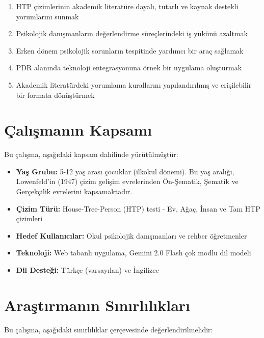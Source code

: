 \begin{enumerate}
  \item HTP çizimlerinin akademik literatüre dayalı, tutarlı ve kaynak destekli yorumlarını sunmak
  \item Psikolojik danışmanların değerlendirme süreçlerindeki iş yükünü azaltmak
  \item Erken dönem psikolojik sorunların tespitinde yardımcı bir araç sağlamak
  \item PDR alanında teknoloji entegrasyonuna örnek bir uygulama oluşturmak
  \item Akademik literatürdeki yorumlama kurallarını yapılandırılmış ve erişilebilir bir formata dönüştürmek
\end{enumerate}

\section{Çalışmanın Kapsamı}

Bu çalışma, aşağıdaki kapsam dahilinde yürütülmüştür:

\begin{itemize}
  \item \textbf{Yaş Grubu:} 5-12 yaş arası çocuklar (ilkokul dönemi). Bu yaş aralığı, Lowenfeld'in (1947) çizim gelişim evrelerinden Ön-Şematik, Şematik ve Gerçekçilik evrelerini kapsamaktadır.
  \item \textbf{Çizim Türü:} House-Tree-Person (HTP) testi - Ev, Ağaç, İnsan ve Tam HTP çizimleri
  \item \textbf{Hedef Kullanıcılar:} Okul psikolojik danışmanları ve rehber öğretmenler
  \item \textbf{Teknoloji:} Web tabanlı uygulama, Gemini 2.0 Flash çok modlu dil modeli
  \item \textbf{Dil Desteği:} Türkçe (varsayılan) ve İngilizce
\end{itemize}

\section{Araştırmanın Sınırlılıkları}

Bu çalışma, aşağıdaki sınırlılıklar çerçevesinde değerlendirilmelidir:

